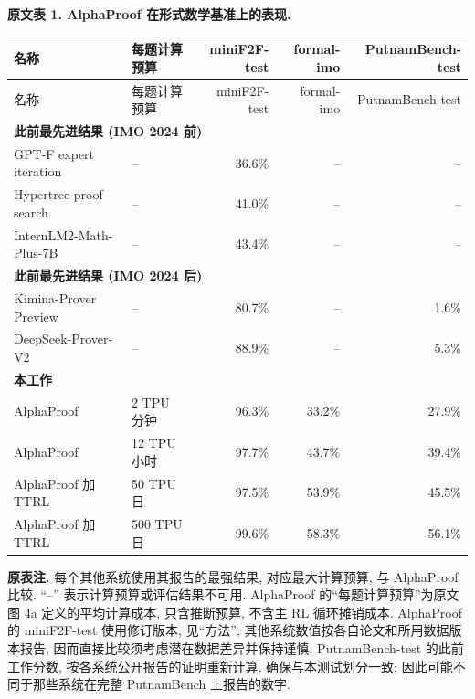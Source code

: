 \noindent\textbf{原文表 1. AlphaProof 在形式数学基准上的表现.}
\begin{longtable}{p{4.8cm}p{2.6cm}rrr}
\toprule
名称 & 每题计算预算 & \shortstack{miniF2F-test\\\cite{alphaproof-ref20}} & formal-imo & \shortstack{PutnamBench-test\\\cite{alphaproof-ref21}} \\
\midrule
\endfirsthead
\toprule
名称 & 每题计算预算 & \shortstack{miniF2F-test\\\cite{alphaproof-ref20}} & formal-imo & \shortstack{PutnamBench-test\\\cite{alphaproof-ref21}} \\
\midrule
\endhead
\multicolumn{5}{l}{\textbf{此前最先进结果 (IMO 2024 前)}} \\
GPT-F expert iteration\cite{alphaproof-ref24} & -- & 36.6\% & -- & -- \\
Hypertree proof search\cite{alphaproof-ref17} & -- & 41.0\% & -- & -- \\
InternLM2-Math-Plus-7B\cite{alphaproof-ref23} & -- & 43.4\% & -- & -- \\
\multicolumn{5}{l}{\textbf{此前最先进结果 (IMO 2024 后)}} \\
Kimina-Prover Preview\cite{alphaproof-ref25} & -- & 80.7\% & -- & 1.6\% \\
DeepSeek-Prover-V2\cite{alphaproof-ref26} & -- & 88.9\% & -- & 5.3\% \\
\multicolumn{5}{l}{\textbf{本工作}} \\
AlphaProof & 2 TPU 分钟 & 96.3\% & 33.2\% & 27.9\% \\
AlphaProof & 12 TPU 小时 & 97.7\% & 43.7\% & 39.4\% \\
AlphaProof 加 TTRL & 50 TPU 日 & 97.5\% & 53.9\% & 45.5\% \\
AlphaProof 加 TTRL & 500 TPU 日 & 99.6\% & 58.3\% & 56.1\% \\
\bottomrule
\end{longtable}
\noindent\textbf{原表注.} 每个其他系统使用其报告的最强结果, 对应最大计算预算, 与 AlphaProof 比较. “--” 表示计算预算或评估结果不可用. AlphaProof 的“每题计算预算”为原文图 4a 定义的平均计算成本, 只含推断预算, 不含主 RL 循环摊销成本. AlphaProof 的 miniF2F-test 使用修订版本, 见“方法”; 其他系统数值按各自论文和所用数据版本报告, 因而直接比较须考虑潜在数据差异并保持谨慎. PutnamBench-test 的此前工作分数, 按各系统公开报告的证明重新计算, 确保与本测试划分一致; 因此可能不同于那些系统在完整 PutnamBench 上报告的数字.
